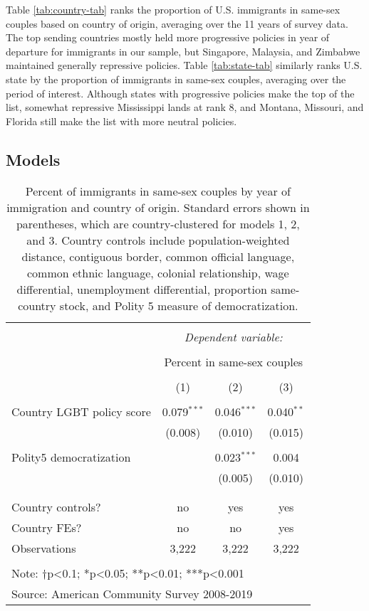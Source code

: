 \documentclass[
  11pt,
]{article}
\begin{document}
Table \ref{tab:country-tab} ranks the proportion of U.S. immigrants in same-sex couples based on country of origin, averaging over the 11 years of survey data. The top sending countries mostly held more progressive policies in year of departure for immigrants in our sample, but Singapore, Malaysia, and Zimbabwe maintained generally repressive policies. Table \ref{tab:state-tab} similarly ranks U.S. state by the proportion of immigrants in same-sex couples, averaging over the period of interest. Although states with progressive policies make the top of the list, somewhat repressive Mississippi lands at rank 8, and Montana, Missouri, and Florida still make the list with more neutral policies.

\hypertarget{models}{%
\subsection{Models}\label{models}}

\begin{table}[!htbp] \centering 
  \caption{Percent of immigrants in same-sex couples by year of immigration and country of origin. Standard errors shown in parentheses, which are country-clustered for models 1, 2, and 3. Country controls include population-weighted distance, contiguous border, common official language, common ethnic language, colonial relationship, wage differential, unemployment differential, proportion same-country stock, and Polity 5 measure of democratization.} 
  \label{tab:country-props} 
\begin{tabular}{@{\extracolsep{5pt}}lccc} 
\\[-1.8ex]\hline 
\hline \\[-1.8ex] 
 & \multicolumn{3}{c}{\textit{Dependent variable:}} \\ 
\cline{2-4} 
\\[-1.8ex] & \multicolumn{3}{c}{Percent in same-sex couples} \\ 
\\[-1.8ex] & (1) & (2) & (3)\\ 
\hline \\[-1.8ex] 
 Country LGBT policy score & 0.079$^{***}$ & 0.046$^{***}$ & 0.040$^{**}$ \\ 
  & (0.008) & (0.010) & (0.015) \\ 
  & & & \\ 
 Polity5 democratization &  & 0.023$^{***}$ & 0.004 \\ 
  &  & (0.005) & (0.010) \\ 
  & & & \\ 
\hline \\[-1.8ex] 
Country controls? & no & yes & yes \\ 
Country FEs? & no & no & yes \\ 
Observations & 3,222 & 3,222 & 3,222 \\ 
\hline 
\hline \\[-1.8ex] 
\multicolumn{4}{l}{Note: †p<0.1; *p<0.05; **p<0.01; ***p<0.001} \\ 
\multicolumn{4}{l}{Source: American Community Survey 2008-2019} \\ 
\end{tabular} 
\end{table}
\end{document}
